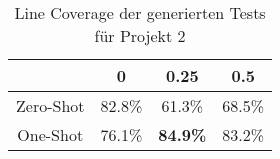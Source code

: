 \bgroup
\def\arraystretch{2}
\begin{table}[H]
	\vspace{.5cm}
	\centering		
	\begin{center}
		\begin{tabular}{|c||c|c|c|}
			\hline 
			& 0 & 0.25 & 0.5 \\
			\hline 
			\hline
			Zero-Shot & 82.8\% & 61.3\% & 68.5\% \\
			\hline
			One-Shot & 76.1\% & \textbf{84.9\%} & 83.2\% \\
			\hline
		\end{tabular} 
	\end{center}
	\caption{Line Coverage der generierten Tests für Projekt 2}
	\label{fig:line-2}
	\vspace{-.8cm}
\end{table}
\egroup